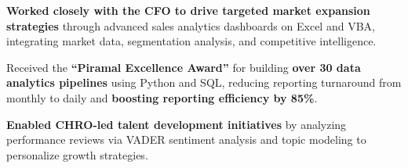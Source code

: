 \documentclass[letterpaper,11pt]{article}
\newcommand{\resumeItem}[1]{
\justifying
  \item{\small{#1}}
  \vspace{-2px}
}
\begin{document}
\resumeItem{\textbf{Worked closely with the CFO to drive targeted market expansion strategies} through advanced sales analytics dashboards on Excel and VBA, integrating market data, segmentation analysis, and competitive intelligence.}


\resumeItem{Received the \textbf{“Piramal Excellence Award”} for building \textbf{over 30 data analytics pipelines} using Python and SQL, reducing   reporting turnaround from monthly to daily and \textbf{boosting reporting efficiency by 85\%}.}




\resumeItem{\textbf{Enabled CHRO-led talent development initiatives} by analyzing performance reviews via VADER sentiment analysis and topic modeling to personalize growth strategies.}
\end{document}
